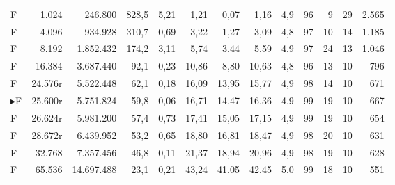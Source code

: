 {\begin{longtable}{l r r r r r r r r r r r r}
F & 1.024 & 246.800 & 828,5 & 5,21 & 1,21 & 0,07 & 1,16 & 4,9 & 96 & 9 & 29 & 2.565 \\
F & 4.096 & 934.928 & 310,7 & 0,69 & 3,22 & 1,27 & 3,09 & 4,8 & 97 & 10 & 14 & 1.185 \\
F & 8.192 & 1.852.432 & 174,2 & 3,11 & 5,74 & 3,44 & 5,59 & 4,9 & 97 & 24 & 13 & 1.046 \\
F & 16.384 & 3.687.440 & 92,1 & 0,23 & 10,86 & 8,80 & 10,63 & 4,8 & 96 & 13 & 10 & 796 \\
F & 24.576r & 5.522.448 & 62,1 & 0,18 & 16,09 & 13,95 & 15,77 & 4,9 & 98 & 14 & 10 & 671 \\
$\blacktriangleright$F & 25.600r & 5.751.824 & 59,8 & 0,06 & 16,71 & 14,47 & 16,36 & 4,9 & 99 & 19 & 10 & 667 \\
F & 26.624r & 5.981.200 & 57,4 & 0,73 & 17,41 & 15,05 & 17,15 & 4,9 & 99 & 19 & 10 & 654 \\
F & 28.672r & 6.439.952 & 53,2 & 0,65 & 18,80 & 16,81 & 18,47 & 4,9 & 98 & 20 & 10 & 631 \\
F & 32.768 & 7.357.456 & 46,8 & 0,11 & 21,37 & 18,94 & 20,96 & 4,9 & 98 & 19 & 10 & 628 \\
F & 65.536 & 14.697.488 & 23,1 & 0,21 & 43,24 & 41,05 & 42,45 & 5,0 & 99 & 18 & 10 & 551 \\
\bottomrule
\end{longtable}
}

